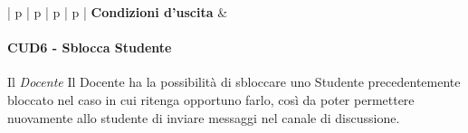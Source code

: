 \begin{table}[!h]
\begin{tabular}{| p{\useCaseLeft} | p{\useCaseNum} | p{\useCaseTwoCol} | p{\useCaseTwoCol} |}
		\hline
		\textbf{Condizioni d'uscita} &  \\
		\hline
	\end{tabular}
	\caption{CUD5 - Blocca Studente}
\end{table}


\newpage
\paragraph{CUD6 - Sblocca Studente \\}
Il \emph{Docente} Il Docente ha la possibilità di sbloccare uno Studente precedentemente bloccato  nel caso in cui ritenga opportuno farlo, così da poter permettere nuovamente allo studente di inviare messaggi nel canale di discussione.    \\
